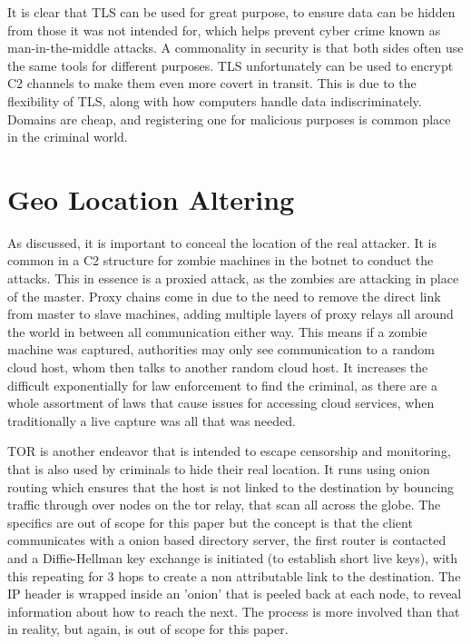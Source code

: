 It is clear that TLS can be used for great purpose, to ensure data can be hidden from those it was not intended for, which helps prevent cyber crime known as man-in-the-middle attacks. A commonality in security is that both sides often use the same tools for different purposes. TLS unfortunately can be used to encrypt C2 
channels to make them even more covert in transit. This is due to the flexibility of TLS, along with how computers handle data indiscriminately. Domains are cheap, and registering one for malicious purposes is common place in the criminal world. \citep{TLS}


\section{Geo Location Altering}
As discussed, it is important to conceal the location of the real attacker. It is common in a C2 structure for zombie machines in the botnet to conduct the attacks. This in essence is a proxied attack,
as the zombies are attacking in place of the master. Proxy chains come in due to the need to remove the direct link from master to slave machines, adding multiple layers of proxy relays all around the world 
in between all communication either way. This means if a zombie machine was captured, authorities may only see communication to a random cloud host, whom then talks to another random cloud host. It increases the
difficult exponentially for law enforcement to find the criminal, as there are a whole assortment of laws that cause issues for accessing cloud services, when traditionally a live capture was all that was needed. 

TOR is another endeavor that is intended to escape censorship and monitoring, that is also used by criminals to hide their real location. It runs using onion routing which ensures that the host is not linked to the destination by
bouncing traffic through over nodes on the tor relay, that scan all across the globe. The specifics are out of scope for this paper but the concept is that the client communicates with a onion based directory server, the first router is
contacted and a Diffie-Hellman key exchange is initiated (to establish short live keys), with this repeating for 3 hops to create a non attributable link to the destination. The IP header is wrapped inside an 'onion' that is peeled back at each node, to reveal information about how to reach the next.
The process is more involved than that in reality, but again, is out of scope for this paper. \citep{TorMalware}


